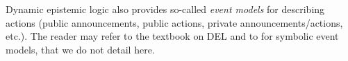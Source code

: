 Dynamic epistemic logic also provides so-called \emph{event models} for describing actions (public announcements, public actions, private announcements/actions, etc.). The reader may refer to the textbook on DEL \cite{DitmarschvdHoekKooi} and to \citet{DBLP:conf/atal/CharrierS17} for symbolic event models, that we do not detail here.
